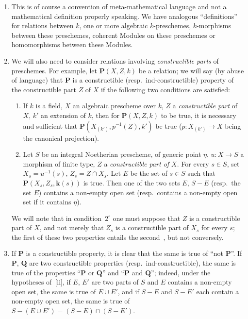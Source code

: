 \begin{remarks}[9.2.2]
\label{IV.9.2.2}
\begin{enumerate}[label=(\roman*)]
  \item This is of course a convention of meta-mathematical language and not a mathematical definition properly speaking.
We have analogous ``definitions'' for relations between $k$, one or more algebraic $k$-preschemes, $k$-morphisms between these preschemes, coherent Modules on these preschemes or homomorphisms between these Modules.
  \item We will also need to consider relations involving \emph{constructible parts} of preschemes.
For example, let $\mathbf{P}(X,Z,k)$ be a relation; we will say (by abuse of language) that $\mathbf{P}$ is a constructible (resp.\ ind-constructible) property of the constructible part $Z$ of $X$ if the following two conditions are satisfied:
\begin{enumerate}[label=$\arabic*^{\mathrm{o}}$]
  \item If $k$ is a field, $X$ an algebraic prescheme over $k$, $Z$ a \emph{constructible part} of $X$, $k'$ an extension of $k$, then for $\mathbf{P}(X,Z,k)$ to be true, it is necessary and sufficient that $\mathbf{P}(X_{(k')},p^{-1}(Z),k')$ be true ($p:X_{(k')}\to X$ being the canonical projection).
  \item Let $S$ be an integral Noetherian prescheme, of generic point $\eta$, $u:X\to S$ a morphism of finite type, $Z$ a \emph{constructible part of $X$}.
For every $s\in S$, set $X_s=u^{-1}(s)$, $Z_s=Z\cap X_s$.
Let $E$ be the set of $s\in S$ such that $\mathbf{P}(X_s,Z_s,\mathbf{k}(s))$ is true.
Then one of the two sets $E$, $S-E$ (resp.\ the set $E$) contains a non-empty open set (resp.\ contains a non-empty open set if it contains $\eta$).
\end{enumerate}

We will note that in condition~$2^\circ$ one must suppose that $Z$ is a constructible part of $X$, and not merely that $Z_s$ is a constructible part of $X_s$ for every $s$; the first of these two properties entails the second~, but not conversely.

  \item If $\mathbf{P}$ is a constructible property, it is clear that the same is true of ``not $\mathbf{P}$''.
If $\mathbf{P}$, $\mathbf{Q}$ are two constructible properties (resp.\ ind-constructible), the same is true of the properties ``$\mathbf{P}$ or $\mathbf{Q}$'' and ``$\mathbf{P}$ and $\mathbf{Q}$''; indeed, under the hypotheses of~[ii], if $E$, $E'$ are two parts of $S$ and $E$ contains a non-empty open set, the same is true of $E\cup E'$, and if $S-E$ and $S-E'$ each contain a non-empty open set, the same is true of $S-(E\cup E')=(S-E)\cap(S-E')$.


\end{enumerate}
\end{remarks}
